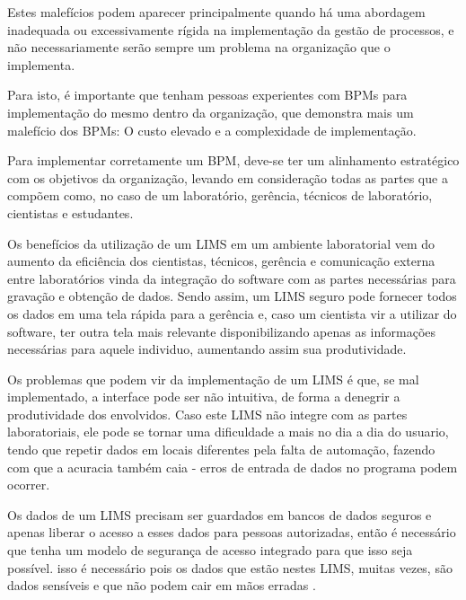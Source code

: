 Estes malefícios podem aparecer principalmente quando há uma abordagem inadequada ou excessivamente rígida na implementação da gestão de processos, e não necessariamente serão sempre um problema na organização que o implementa.

Para isto, é importante que tenham pessoas experientes com BPMs para implementação do mesmo dentro da organização, que demonstra mais um malefício dos BPMs: O custo elevado e a complexidade de implementação.

Para implementar corretamente um BPM, deve-se ter um alinhamento estratégico com os objetivos da organização, levando em consideração todas as partes que a compõem como, no caso de um laboratório, gerência, técnicos de laboratório, cientistas e estudantes.



Os benefícios da utilização de um LIMS em um ambiente laboratorial vem do aumento da eficiência dos cientistas, técnicos, gerência e comunicação externa entre laboratórios vinda da integração do software com as partes necessárias para gravação e obtenção de dados. Sendo assim, um LIMS seguro pode fornecer todos os dados em uma tela rápida para a gerência e, caso um cientista vir a utilizar do software, ter outra tela mais relevante disponibilizando apenas as informações necessárias para aquele individuo, aumentando assim sua produtividade.


Os problemas que podem vir da implementação de um LIMS é que, se mal implementado, a interface pode ser não intuitiva, de forma a denegrir a produtividade dos envolvidos. Caso este LIMS não integre com as partes laboratoriais, ele pode se tornar uma dificuldade a mais no dia a dia do usuario, tendo que repetir dados em locais diferentes pela falta de automação, fazendo com que a acuracia também caia - erros de entrada de dados no programa podem ocorrer.



Os dados de um LIMS precisam ser guardados em bancos de dados seguros e apenas liberar o acesso a esses dados para pessoas autorizadas, então é necessário que tenha um modelo de segurança de acesso integrado para que isso seja possível. isso é necessário \NO pois os dados que estão nestes LIMS, muitas vezes, são dados sensíveis e que não podem cair em mãos erradas \R \NO.

